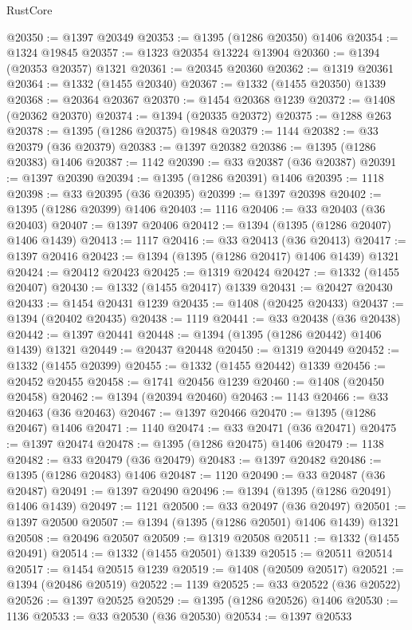\begin{lexlean}{RustCore}
\begin{coremodule}
@20350 := @1397 @20349
@20353 := @1395 (@1286 @20350) @1406
@20354 := @1324 @19845
@20357 := @1323 @20354 @13224 @13904
@20360 := @1394 (@20353 @20357) @1321
@20361 := @20345 @20360
@20362 := @1319 @20361
@20364 := @1332 (@1455 @20340)
@20367 := @1332 (@1455 @20350) @1339
@20368 := @20364 @20367
@20370 := @1454 @20368 @1239
@20372 := @1408 (@20362 @20370)
@20374 := @1394 (@20335 @20372)
@20375 := @1288 @263
@20378 := @1395 (@1286 @20375) @19848
@20379 := 1144
@20382 := @33 @20379 (@36 @20379)
@20383 := @1397 @20382
@20386 := @1395 (@1286 @20383) @1406
@20387 := 1142
@20390 := @33 @20387 (@36 @20387)
@20391 := @1397 @20390
@20394 := @1395 (@1286 @20391) @1406
@20395 := 1118
@20398 := @33 @20395 (@36 @20395)
@20399 := @1397 @20398
@20402 := @1395 (@1286 @20399) @1406
@20403 := 1116
@20406 := @33 @20403 (@36 @20403)
@20407 := @1397 @20406
@20412 := @1394 (@1395 (@1286 @20407) @1406 @1439)
@20413 := 1117
@20416 := @33 @20413 (@36 @20413)
@20417 := @1397 @20416
@20423 := @1394 (@1395 (@1286 @20417) @1406 @1439) @1321
@20424 := @20412 @20423
@20425 := @1319 @20424
@20427 := @1332 (@1455 @20407)
@20430 := @1332 (@1455 @20417) @1339
@20431 := @20427 @20430
@20433 := @1454 @20431 @1239
@20435 := @1408 (@20425 @20433)
@20437 := @1394 (@20402 @20435)
@20438 := 1119
@20441 := @33 @20438 (@36 @20438)
@20442 := @1397 @20441
@20448 := @1394 (@1395 (@1286 @20442) @1406 @1439) @1321
@20449 := @20437 @20448
@20450 := @1319 @20449
@20452 := @1332 (@1455 @20399)
@20455 := @1332 (@1455 @20442) @1339
@20456 := @20452 @20455
@20458 := @1741 @20456 @1239
@20460 := @1408 (@20450 @20458)
@20462 := @1394 (@20394 @20460)
@20463 := 1143
@20466 := @33 @20463 (@36 @20463)
@20467 := @1397 @20466
@20470 := @1395 (@1286 @20467) @1406
@20471 := 1140
@20474 := @33 @20471 (@36 @20471)
@20475 := @1397 @20474
@20478 := @1395 (@1286 @20475) @1406
@20479 := 1138
@20482 := @33 @20479 (@36 @20479)
@20483 := @1397 @20482
@20486 := @1395 (@1286 @20483) @1406
@20487 := 1120
@20490 := @33 @20487 (@36 @20487)
@20491 := @1397 @20490
@20496 := @1394 (@1395 (@1286 @20491) @1406 @1439)
@20497 := 1121
@20500 := @33 @20497 (@36 @20497)
@20501 := @1397 @20500
@20507 := @1394 (@1395 (@1286 @20501) @1406 @1439) @1321
@20508 := @20496 @20507
@20509 := @1319 @20508
@20511 := @1332 (@1455 @20491)
@20514 := @1332 (@1455 @20501) @1339
@20515 := @20511 @20514
@20517 := @1454 @20515 @1239
@20519 := @1408 (@20509 @20517)
@20521 := @1394 (@20486 @20519)
@20522 := 1139
@20525 := @33 @20522 (@36 @20522)
@20526 := @1397 @20525
@20529 := @1395 (@1286 @20526) @1406
@20530 := 1136
@20533 := @33 @20530 (@36 @20530)
@20534 := @1397 @20533

\end{coremodule}
\end{lexlean}
